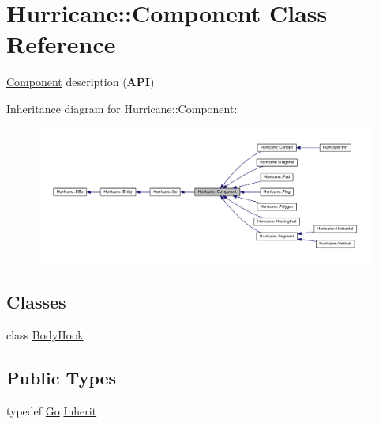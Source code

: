 \hypertarget{classHurricane_1_1Component}{\section{Hurricane\-:\-:Component Class Reference}
\label{classHurricane_1_1Component}
}


\hyperlink{classHurricane_1_1Component}{Component} description ({\bfseries A\-P\-I})  




Inheritance diagram for Hurricane\-:\-:Component\-:\nopagebreak
\begin{figure}[H]
\begin{center}
\leavevmode
\includegraphics[width=350pt]{classHurricane_1_1Component__inherit__graph}
\end{center}
\end{figure}
\subsection*{Classes}
\begin{DoxyCompactItemize}
\item 
class \hyperlink{classHurricane_1_1Component_1_1BodyHook}{Body\-Hook}
\end{DoxyCompactItemize}
\subsection*{Public Types}
\begin{DoxyCompactItemize}
\item 
typedef \hyperlink{classHurricane_1_1Go}{Go} \hyperlink{classHurricane_1_1Component_a3911e94f9d220eb809d349b1181034e3}{Inherit}
\end{DoxyCompactItemize}
